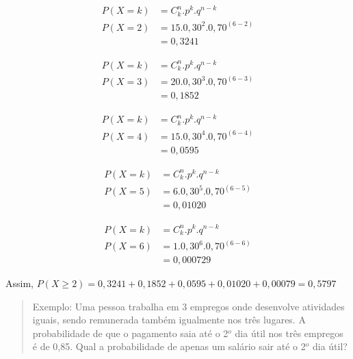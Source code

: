 \documentclass[
]{book}
\begin{document}
\hfill\break

\begin{align*}
P\left(X=k\right) & ={C}_{k}^{n}. {p}^{k}. {q}^{n-k} \\
P\left(X=2\right) & = 15 . 0,30^{2} . 0,70^{(6-2)} \\
                  & = 0,3241
\end{align*}

\hfill\break

\begin{align*}
P\left(X=k\right) & ={C}_{k}^{n}. {p}^{k}. {q}^{n-k} \\
P\left(X=3\right) & = 20 . 0,30^{3} . 0,70^{(6-3)} \\
                  & = 0,1852
\end{align*}

\hfill\break

\begin{align*}
P\left(X=k\right) & ={C}_{k}^{n}. {p}^{k}. {q}^{n-k} \\
P\left(X=4\right) & = 15 . 0,30^{4} . 0,70^{(6-4)} \\
                  & = 0,0595
\end{align*}

\hfill\break

\begin{align*}
P\left(X=k\right) & ={C}_{k}^{n}. {p}^{k}. {q}^{n-k} \\
P\left(X=5\right) & = 6 . 0,30^{5} . 0,70^{(6-5)} \\
                  & = 0,01020
\end{align*}

\hfill\break

\begin{align*}
P\left(X=k\right) & ={C}_{k}^{n}. {p}^{k}. {q}^{n-k} \\
P\left(X=6\right) & = 1 . 0,30^{6} . 0,70^{(6-6)} \\
                  & = 0,000729
\end{align*}

Assim, \(P\left(X\ge2\right)=0,3241+0,1852+0,0595+0,01020+0,00079=0,5797\)

\hfill\break

\begin{quote}
Exemplo: Uma pessoa trabalha em 3 empregos onde desenvolve atividades iguais, sendo remunerada também igualmente nos três lugares. A probabilidade de que o pagamento saia até o 2\(^{o}\) dia útil nos três empregos é de 0,85. Qual a probabilidade de apenas um salário sair até o 2\(^{o}\) dia útil?
\end{quote}
\end{document}
